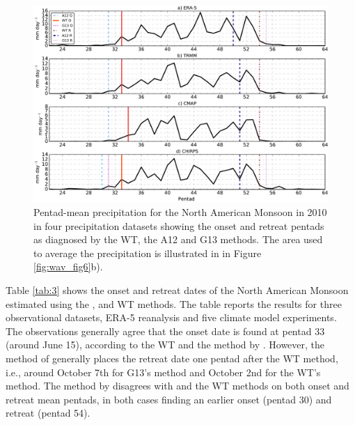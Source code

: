 \begin{figure}[t!]
\centering
 \includegraphics[width=\linewidth]{figures/wav_fig5.pdf}
\caption[Comparison of methods in 2010 in the North American Monsoon]{  Pentad-mean precipitation for the North American Monsoon in 2010 in four precipitation datasets showing the onset and retreat pentads as diagnosed by the WT, the A12 and G13 methods. The area used to average the precipitation is illustrated in in Figure \ref{fig:wav_fig6}b).} 
\label{fig:wav_compari}
\end{figure}


Table \ref{tab:3} shows the onset and retreat dates of the North American Monsoon estimated using the ,  and WT methods.
The table reports the results for three observational datasets, ERA-5 reanalysis and five climate model experiments.
The observations generally agree that the onset date is found at pentad 33 (around June 15), according to the WT and the method by .
However, the method of  generally places the retreat date one pentad after the WT method, i.e., around October 7th for G13's method and October 2nd for the WT's method.
The method by  disagrees with  and the WT methods on both onset and retreat mean pentads, in both cases finding an earlier onset (pentad 30) and retreat (pentad 54). 


